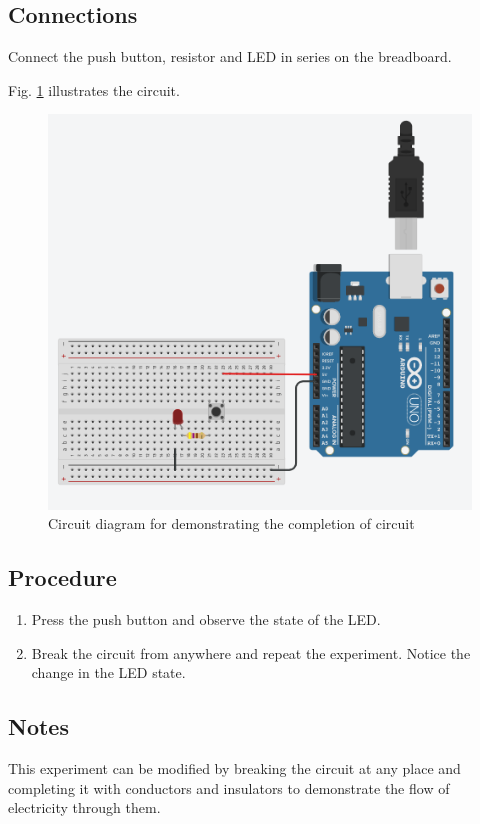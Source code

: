 \subsection*{Connections}
 Connect the push button, resistor and LED in series on the breadboard.

Fig. \ref{fig:elec-oc} illustrates the circuit.

\begin{figure}[!ht]
    \centering
    \includegraphics[scale=0.6]{Figures/electricity-open-close.PNG}
    \caption{Circuit diagram for demonstrating the completion of circuit}
    \label{fig:elec-oc}
\end{figure}

\subsection*{Procedure}
\begin{enumerate}[leftmargin=*]
    \item Press the push button and observe the state of the LED.
    \item Break the circuit from anywhere and repeat the experiment. Notice the change in the LED state.
\end{enumerate}


\subsection*{Notes}
This experiment can be modified by breaking the circuit at any place and completing it with conductors and insulators to demonstrate the flow of electricity through them.

